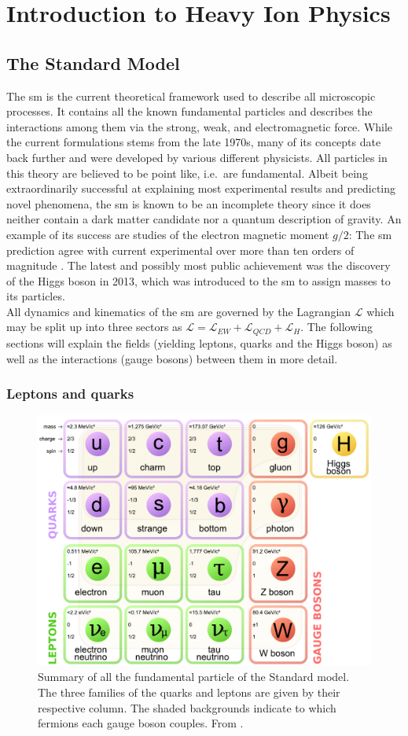 \chapter{Introduction to Heavy Ion Physics}
\label{sec:concepts}
\section{The Standard Model}
\label{sec:sm}
The \gls{sm} is the current theoretical framework used to describe all microscopic processes. It contains all the known fundamental particles and describes the interactions among them via the strong, weak, and electromagnetic force. While the current formulations stems from the late 1970s, many of its concepts date back further and were developed by various different physicists. All particles in this theory are believed to be point like, i.e.\ are fundamental. Albeit being extraordinarily successful at explaining most experimental results and predicting novel phenomena, the \gls{sm} is known to be an incomplete theory since it does neither contain a dark matter candidate nor a quantum description of gravity. An example of its success are studies of the electron magnetic moment $g/2$: The \gls{sm} prediction agree with current experimental over more than ten orders of magnitude \cite{Odom2006}. The latest and possibly most public achievement was the discovery of the Higgs boson in 2013, which was introduced to the \gls{sm} to assign masses to its particles.\\


All dynamics and kinematics of the \gls{sm} are governed by the Lagrangian $\mathcal{L}$ which may be split up into three sectors as $\mathcal{L} = \mathcal{L}_{EW} + \mathcal{L}_{QCD} + \mathcal{L}_{H}$. The following sections will explain the fields (yielding leptons, quarks and the Higgs boson) as well as the interactions (gauge bosons) between them in more detail.


\subsection{Leptons and quarks}
\label{sec:leptons-and-quarks}
\begin{figure}
  \centering
  \includegraphics[width=.6\textwidth]{figures/sm-particles.pdf}
  \caption[Summary of all the fundamental particle of the Standard model.]{Summary of all the fundamental particle of the Standard model. The three families of the quarks and leptons are given by their respective column. The shaded backgrounds indicate to which fermions each gauge boson couples. From \cite{Cush2014}.}
  \label{fig:sm}
\end{figure}

